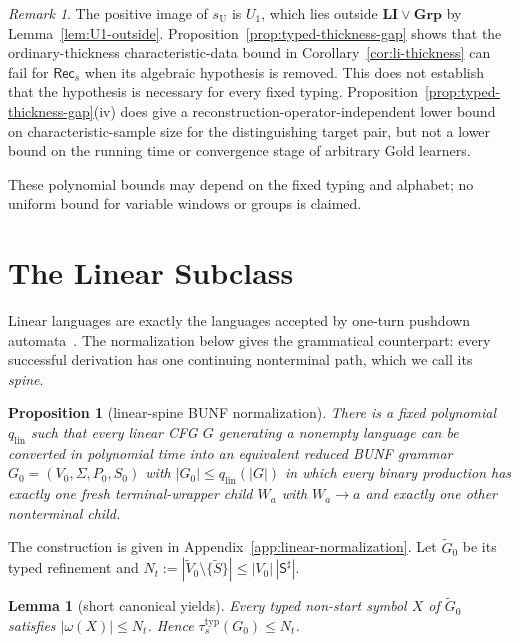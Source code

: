 \documentclass[11pt,a4paper]{article}
\newtheorem{lemma}[theorem]{Lemma}
\newtheorem{proposition}[theorem]{Proposition}
\theoremstyle{remark}
\newtheorem{remark}[theorem]{Remark}
\theoremstyle{plain}
\begin{document}
\begin{remark}
The positive image of $s_{\mathrm U}$ is $U_1$, which lies outside
$\mathbf{LI}\vee\mathbf{Grp}$ by Lemma~\ref{lem:U1-outside}.
Proposition~\ref{prop:typed-thickness-gap} shows that the
ordinary-thickness characteristic-data bound in
Corollary~\ref{cor:li-thickness} can fail for
$\mathsf{Rec}_s$ when its algebraic hypothesis is removed.
This does not establish that the hypothesis is necessary
for every fixed typing. Proposition~\ref{prop:typed-thickness-gap}(iv)
does give a reconstruction-operator-independent lower bound
on characteristic-sample size for the distinguishing target
pair, but not a lower bound on the running time or convergence
stage of arbitrary Gold learners.
\end{remark}

These polynomial bounds may depend on the fixed typing and alphabet;
no uniform bound for variable windows or groups is claimed.

\section{The Linear Subclass}
\label{sec:linear}

Linear languages are exactly the languages accepted by one-turn pushdown
automata~\cite{ginsburg-spanier1966,autebert1997}.  The normalization below
gives the grammatical counterpart: every successful derivation has one
continuing nonterminal path, which we call its \emph{spine}.

\begin{proposition}[linear-spine BUNF normalization]\label{prop:linear-normal}
There is a fixed polynomial $q_{\mathrm{lin}}$ such that every linear CFG
$G$ generating a nonempty language can be converted in polynomial time into
an equivalent reduced BUNF grammar $G_0=(V_0,\Sigma,P_0,S_0)$ with
$|G_0|\le q_{\mathrm{lin}}(|G|)$ in which every binary production has
exactly one fresh terminal-wrapper child $W_a$ with $W_a\to a$ and exactly
one other nonterminal child.
\end{proposition}

The construction is given in Appendix~\ref{app:linear-normalization}.  Let
$\widetilde G_0$ be its typed refinement and
$N_t:=|\widetilde V_0\setminus\{\widetilde S\}|\le|V_0|\,|\mathsf S^\sharp|$.

\begin{lemma}[short canonical yields]\label{lem:linear-short}
Every typed non-start symbol $X$ of $\widetilde G_0$ satisfies
$|\omega(X)|\le N_t$.
Hence $\tau_s^{\mathrm{typ}}(G_0)\le N_t$.
\end{lemma}
\end{document}
